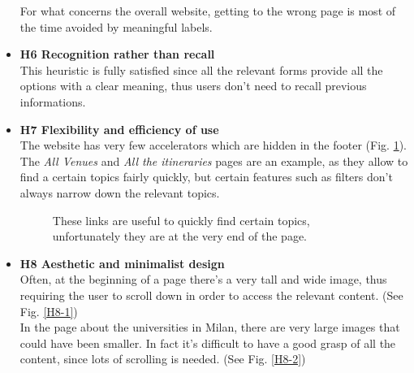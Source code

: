 \begin{itemize}
\begin{enumerate}
        \end{enumerate}  
        For what concerns the overall website, getting to the wrong page is most of the time avoided by meaningful labels.
    \item \textbf{H6 Recognition rather than recall}\\
        This heuristic is fully satisfied since all the relevant forms provide all the options with a clear meaning, thus users don't need to recall previous informations.
    \item \textbf{H7 Flexibility and efficiency of use}\\
        The website has very few accelerators which are hidden in the footer (Fig. \ref{H7-1}). The  \emph{All Venues} and \emph{All the itineraries} pages are an example, as they allow to find a certain topics fairly quickly, but certain features such as filters don't always narrow down the relevant topics.
        \begin{figure}[!ht]
            \begin{minipage}{\linewidth}
                \centering
                \captionsetup{justification=centering}
                \caption{These links are useful to quickly find certain topics, unfortunately they are at the very end of the page.}
                \label{H7-1}
            \end{minipage}
        \end{figure}
    \item \textbf{H8 Aesthetic and minimalist design}\\
        Often, at the beginning of a page there's a very tall and wide image, thus requiring the user to scroll down in order to access the relevant content. (See Fig. \ref{H8-1})\\
        In the page about the universities in Milan, there are very large images that could have been smaller. In fact it's difficult to have a good grasp of all the content, since lots of scrolling is needed. (See Fig. \ref{H8-2})
        \begin{figure}[!ht]

\end{figure}
\end{itemize}

